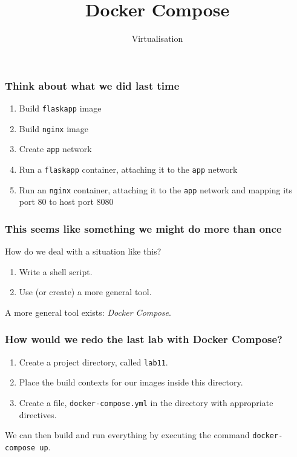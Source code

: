 \documentclass[10pt]{beamer}
\title{Docker Compose}
\author[I720]{Virtualisation}
\institute[Otago Polytechnic]{
  Otago Polytechnic \\
  Dunedin, New Zealand \\
}
\date{}
\begin{document}
\begin{frame}[plain]
  \titlepage
\end{frame}

\begin{frame}
  \frametitle{Think about what we did last time}
  
  \begin{enumerate}
    \item Build \texttt{flaskapp} image
    \item Build \texttt{nginx} image
    \item Create \texttt{app} network
    \item Run a \texttt{flaskapp} container, attaching it to the \texttt{app} network
    \item Run an \texttt{nginx} container, attaching it to the \texttt{app} network and mapping its port 80 to host port 8080
  \end{enumerate}
\end{frame}

\begin{frame}
  \frametitle{This seems like something we might do more than once}
  
   How do we deal with a situation like this?
   
   \begin{enumerate}
     \item Write a shell script.
     \item Use (or create) a more general tool.
   \end{enumerate}
   
   A more general tool exists: \emph{Docker Compose}.

\end{frame}

\begin{frame}
  \frametitle{How would we redo the last lab with Docker Compose?}
   
   \begin{enumerate}
     \item Create a project directory, called \texttt{lab11}.
     \item Place the build contexts for our images inside this directory.
     \item Create a file, \texttt{docker-compose.yml} in the directory with appropriate directives.
   \end{enumerate}
   
   We can then build and run everything by executing the command \texttt{docker-compose up}.

\end{frame}
\end{document}

